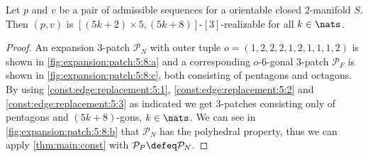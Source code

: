 \clearpage
\begin{theorem}
  Let $p$ and $v$ be a pair of admissible sequences for a orientable closed $2$-manifold $S$. Then $(p, v)$ is $[(5k + 2) \times 5, (5k+8)]$-$[3]$-realizable for all $k \in \nats$.
  \begin{proof}
    An expansion $3$-patch $\mathcal{P}_N$ with outer tuple $o = (1, 2, 2, 2, 1, 2, 1, 1, 1, 2)$ is shown in \autoref{fig:expansion:patch:5:8:a} and a corresponding $o$-$6$-gonal $3$-patch $\mathcal{P}_F$ is shown in \autoref{fig:expansion:patch:5:8:c}, both consisting of pentagons and octagons. By using \autoref{const:edge:replacement:5:1}, \autoref{const:edge:replacement:5:2} and \autoref{const:edge:replacement:5:3} as indicated we get $3$-patches consisting only of pentagons and $(5k+8)$-gons, $k \in \nats$. We can see in \autoref{fig:expansion:patch:5:8:b} that $\mathcal{P}_N$ has the polyhedral property, thus we can apply \autoref{thm:main:const} with $\mathcal{P}_P \defeq \mathcal{P}_N$.
  \end{proof}
\end{theorem}%
